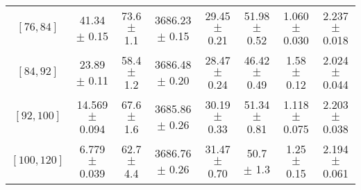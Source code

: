 \begin{tabular}{c||c|c|c|c|c|c|c}
$[76, 84]$ & 41.34 $\pm$ 0.15 & 73.6 $\pm$ 1.1 & 3686.23 $\pm$ 0.15 & 29.45 $\pm$ 0.21 & 51.98 $\pm$ 0.52 & 1.060 $\pm$ 0.030 & 2.237 $\pm$ 0.018\\
$[84, 92]$ & 23.89 $\pm$ 0.11 & 58.4 $\pm$ 1.2 & 3686.48 $\pm$ 0.20 & 28.47 $\pm$ 0.24 & 46.42 $\pm$ 0.49 & 1.58 $\pm$ 0.12 & 2.024 $\pm$ 0.044\\
$[92, 100]$ & 14.569 $\pm$ 0.094 & 67.6 $\pm$ 1.6 & 3685.86 $\pm$ 0.26 & 30.19 $\pm$ 0.33 & 51.34 $\pm$ 0.81 & 1.118 $\pm$ 0.075 & 2.203 $\pm$ 0.038\\
$[100, 120]$ & 6.779 $\pm$ 0.039 & 62.7 $\pm$ 4.4 & 3686.76 $\pm$ 0.26 & 31.47 $\pm$ 0.70 & 50.7 $\pm$ 1.3 & 1.25 $\pm$ 0.15 & 2.194 $\pm$ 0.061\\
\end{tabular}
